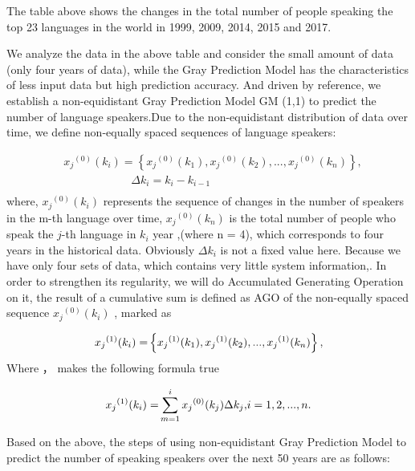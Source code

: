 The table above shows the changes in the total number of people speaking the top 23 languages in the world in 1999, 2009, 2014, 2015 and 2017.
 
 We analyze the data in the above table and consider the small amount of data (only four years of data), while the Gray Prediction Model has the characteristics of less input data but high prediction accuracy. And driven by reference, we establish a non-equidistant Gray Prediction Model GM (1,1) to predict the number of language speakers.Due to the non-equidistant distribution of data over time, we define non-equally spaced sequences of language speakers:



\begin{equation}
\begin{aligned}
& {x_j}^{(0)}({k_i}) = \left\{ {{x_j}^{(0)}({k_1}),{x_j}^{(0)}({k_2}),...,{x_j}^{(0)}({k_n})} \right\} ,\\
& \qquad \qquad \qquad \Delta {k_i} = {k_i} - {k_{i - 1}} \\
\end{aligned}
\end{equation}
\noindent
where, ${x_j}^{(0)}({k_i})$ represents the sequence of changes in the number of speakers in the m-th language over time, ${x_j}^{(0)}({k_n})$  is the total number of people who speak the $j$-th language in ${k_i}$ year ,(where n = 4), which corresponds to four years in the historical data. Obviously $\Delta {k_i}$  is not a fixed value here. Because we have only four sets of data, which contains very little system information,. In order to strengthen its regularity, we will do Accumulated Generating Operation on it, the result of a cumulative sum is defined as AGO of the non-equally spaced sequence ${x_j}^{(0)}({k_i})$ , marked as

\begin{equation}
{x_j}^{(1)}{\rm{(}}{k_i}{\rm{) = }}\left\{ {{x_j}^{(1)}({k_1}),{x_j}^{(1)}({k_2}),...,{x_j}^{(1)}({k_n})} \right\},\label{aa1}
\end{equation}
\noindent
Where ，  makes the following formula true 

\begin{equation}
{x_j}^{(1)}{\rm{(}}{k_i}{\rm{) = }}\sum\limits_{m = 1}^i {{x_j}^{(0)}({k_j})\Delta {k_j}{\rm{ ,  }}} i = 1,2,...,n. 
\end{equation}

Based on the above, the steps of using non-equidistant Gray Prediction Model to predict the number of speaking speakers over the next 50 years are as follows:

